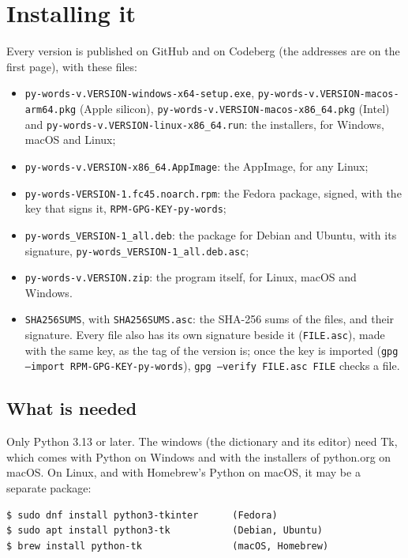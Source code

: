 \documentclass[12pt,
              article,
              oneside
              ]{memoir}
\begin{document}
\section{Installing it}
\label{sec:install}

Every version is published on GitHub and on Codeberg (the addresses are on
the first page), with these files:

%
\begin{itemize}
\item \texttt{py-words-v.VERSION-windows-x64-setup.exe},
  \texttt{py-words-v.VERSION-macos-arm64.pkg} (Apple silicon),
  \texttt{py-words-v.VERSION-macos-x86\_64.pkg} (Intel) and
  \texttt{py-words-v.VERSION-linux-x86\_64.run}: the installers, for
  Windows, macOS and Linux;
\item \texttt{py-words-v.VERSION-x86\_64.AppImage}: the AppImage, for any
  Linux;
\item \texttt{py-words-VERSION-1.fc45.noarch.rpm}: the Fedora package,
  signed, with the key that signs it, \texttt{RPM-GPG-KEY-py-words};
\item \texttt{py-words\_VERSION-1\_all.deb}: the package for Debian and
  Ubuntu, with its signature, \texttt{py-words\_VERSION-1\_all.deb.asc};
\item \texttt{py-words-v.VERSION.zip}: the program itself, for Linux,
  macOS and Windows.
\item \texttt{SHA256SUMS}, with \texttt{SHA256SUMS.asc}: the SHA-256 sums of
  the files, and their signature. Every file also has its own signature
  beside it (\texttt{FILE.asc}), made with the same key, as the tag of the
  version is; once the key is imported (\texttt{gpg --import
  RPM-GPG-KEY-py-words}), \texttt{gpg --verify FILE.asc FILE} checks a file.
\end{itemize}

\subsection{What is needed}

%
Only Python 3.13 or later. The windows (the dictionary and its editor)
need Tk, which comes with Python on Windows and with the installers of
python.org on macOS. On Linux, and with Homebrew's Python on macOS, it may
be a separate package:

\begin{verbatim}
$ sudo dnf install python3-tkinter      (Fedora)
$ sudo apt install python3-tk           (Debian, Ubuntu)
$ brew install python-tk                (macOS, Homebrew)
\end{verbatim}
\end{document}
